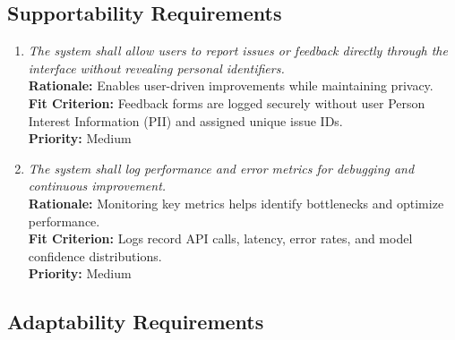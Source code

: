 \documentclass[12pt]{article}
\begin{document}
\subsection{Supportability Requirements}

\begin{enumerate}[label=MS-SUP\arabic*., wide=0pt, leftmargin=*]
  \item \emph{The system shall allow users to report issues or feedback directly through the interface without revealing personal identifiers.}\\[2mm]
    {\bf Rationale:} Enables user-driven improvements while maintaining privacy.\\
    {\bf Fit Criterion:} Feedback forms are logged securely without user Person Interest Information (PII) and assigned unique issue IDs.\\
    {\bf Priority:} Medium

  \item \emph{The system shall log performance and error metrics for
    debugging and continuous improvement.}\\[2mm]
    {\bf Rationale:} Monitoring key metrics helps identify
    bottlenecks and optimize performance.\\
    {\bf Fit Criterion:} Logs record API calls, latency, error rates,
    and model confidence distributions.\\
    {\bf Priority:} Medium
\end{enumerate}

\subsection{Adaptability Requirements}
\end{document}
